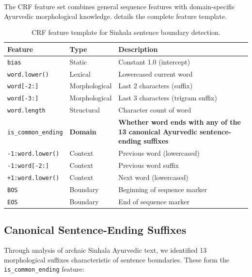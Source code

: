 \documentclass[12pt, a4paper, twoside]{report}
\begin{document}
The CRF feature set combines general sequence features with domain-specific Ayurvedic morphological knowledge.  details the complete feature template.

\begin{table}[htbp]
\centering
\caption{CRF feature template for Sinhala sentence boundary detection.}
\label{tab:features}
\begin{tabular}{llp{6cm}}
\toprule
\textbf{Feature} & \textbf{Type} & \textbf{Description} \\
\midrule
\texttt{bias} & Static & Constant 1.0 (intercept) \\
\texttt{word.lower()} & Lexical & Lowercased current word \\
\texttt{word[-2:]} & Morphological & Last 2 characters (suffix) \\
\texttt{word[-3:]} & Morphological & Last 3 characters (trigram suffix) \\
\texttt{word.length} & Structural & Character count of word \\
\texttt{is\_common\_ending} & \textbf{Domain} & \textbf{Whether word ends with any of the 13 canonical Ayurvedic sentence-ending suffixes} \\
\texttt{-1:word.lower()} & Context & Previous word (lowercased) \\
\texttt{-1:word[-2:]} & Context & Previous word suffix \\
\texttt{+1:word.lower()} & Context & Next word (lowercased) \\
\texttt{BOS} & Boundary & Beginning of sequence marker \\
\texttt{EOS} & Boundary & End of sequence marker \\
\bottomrule
\end{tabular}
\end{table}

\subsection{Canonical Sentence-Ending Suffixes}
\label{sec:suffixes}

Through analysis of archaic Sinhala Ayurvedic text, we identified 13 morphological suffixes characteristic of sentence boundaries. These form the \texttt{is\_common\_ending} feature:
\end{document}
